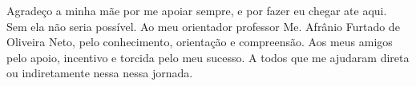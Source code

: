


Agradeço a minha mãe por me apoiar sempre, e por fazer eu chegar ate aqui. Sem ela não seria possível.
Ao meu orientador professor Me. Afrânio Furtado de Oliveira Neto, pelo conhecimento, orientação e compreensão.
Aos meus amigos pelo apoio, incentivo e torcida pelo meu sucesso.
A todos que me ajudaram direta ou indiretamente nessa nessa jornada. 












